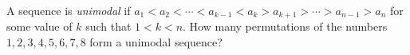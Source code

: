 A sequence is \emph{unimodal} if $a_1<a_2<\cdots<a_{k-1}<a_k>a_{k+1}>\cdots>a_{n-1}>a_n$ for some value of $k$ such that $1<k<n$. How many permutations of the numbers $1,2,3,4,5,6,7,8$ form a unimodal sequence?
